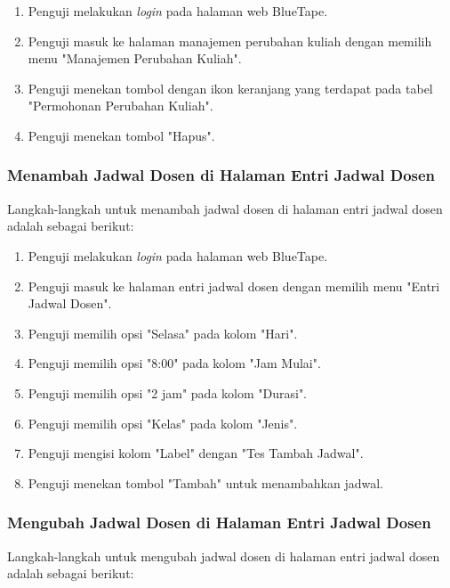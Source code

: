 \begin{enumerate}
    \item Penguji melakukan \textit{login} pada halaman web BlueTape.
    \item Penguji masuk ke halaman manajemen perubahan kuliah dengan memilih menu "Manajemen Perubahan Kuliah".
    \item Penguji menekan tombol dengan ikon keranjang yang terdapat pada tabel "Permohonan Perubahan Kuliah".
    \item Penguji menekan tombol "Hapus".
\end{enumerate}

\subsubsection{Menambah Jadwal Dosen di Halaman Entri Jadwal Dosen}
\label{subsubsec:skenario_menambah_jadwal_dosen_di_halaman_entri_jadwal_dosen}
Langkah-langkah untuk menambah jadwal dosen di halaman entri jadwal dosen adalah sebagai berikut:

\begin{enumerate}
    \item Penguji melakukan \textit{login} pada halaman web BlueTape.
    \item Penguji masuk ke halaman entri jadwal dosen dengan memilih menu "Entri Jadwal Dosen".
    \item Penguji memilih opsi "Selasa" pada kolom "Hari".
    \item Penguji memilih opsi "8:00" pada kolom "Jam Mulai".
    \item Penguji memilih opsi "2 jam" pada kolom "Durasi".
    \item Penguji memilih opsi "Kelas" pada kolom "Jenis".
    \item Penguji mengisi kolom "Label" dengan "Tes Tambah Jadwal".
    \item Penguji menekan tombol "Tambah" untuk menambahkan jadwal.
\end{enumerate}

\subsubsection{Mengubah Jadwal Dosen di Halaman Entri Jadwal Dosen}
\label{subsubsec:skenario_mengubah_jadwal_dosen_di_halaman_entri_jadwal_dosen}
Langkah-langkah untuk mengubah jadwal dosen di halaman entri jadwal dosen adalah sebagai berikut:

